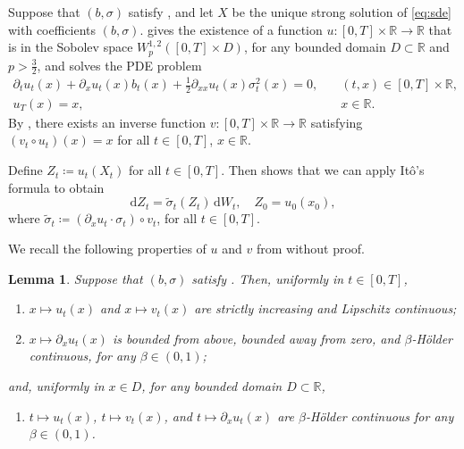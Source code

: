 \documentclass[onseside, final]{amsart}
\newtheorem{lemma}[theorem]{Lemma}
\theoremstyle{definition}
\newcommand{\R}{\mathbb R}
\newcommand{\D}{\,\mathrm{d}}
\newcommand{\ds}{\mathrm{d}}
\numberwithin{equation}{section}
\begin{document}
	Suppose that $(b, \sigma)$ satisfy , and let $X$ be the unique strong solution of \eqref{eq:sde} with coefficients $(b, \sigma)$. \citet[Theorem 1]{Zv74} gives the existence of a function $u\colon[0, T] \times \R \to \R$ that is in the Sobolev space $W^{1, 2}_p([0, T] \times D)$, for any bounded domain $D \subset \R$ and $p > \frac32$, and solves the PDE problem
	\begin{equation}\label{eq:zvonkin-pde}
		\begin{split}
			\partial_t u_t(x) + \partial_x u_t(x)b_t(x) + \frac12\partial_{xx}u_t(x)\sigma_t^2(x) = 0, & \quad (t, x) \in [0, T] \times \R,\\
				u_T(x) = x, & \quad x \in \R.
		\end{split}
	\end{equation}
	By \cite[Theorem 2]{Zv74}, there exists an inverse function $v \colon [0, T] \times \R \to \R$ satisfying $(v_t \circ u_t)(x) = x$ for all $t \in [0, T]$, $x \in \R$.
	
	Define $Z_t \coloneqq u_t(X_t)$ for all $t \in [0, T]$. Then \cite[Theorem 3]{Zv74} shows that we can apply It\^o's formula to obtain
	\begin{equation}\label{eq:transf-sde-zvonkin}
			\ds Z_t = \tilde \sigma_t(Z_t)\D W_t, \quad Z_0 = u_0(x_0),
	\end{equation}
	where $\tilde \sigma_t  \coloneqq (\partial_x u_t \cdot \sigma_t) \circ v_t$, for all $t \in [0, T]$.
	
	We recall the following properties of $u$ and $v$ from \cite[Theorem 2]{Zv74} without proof.
	\begin{lemma}\label{lem:G-properties}
		Suppose that $(b, \sigma)$ satisfy . Then, uniformly in $t \in [0, T]$,
		\begin{enumerate}[label = (\roman*)]
			\item \label{it:G1} $x \mapsto u_t(x)$ and $x \mapsto v_t(x)$ are strictly increasing and Lipschitz continuous;
			\item \label{it:G2} $x \mapsto \partial_x u_t(x)$ is bounded from above, bounded away from zero, and $\beta$-H\"older continuous, for any $\beta \in (0, 1)$;
		\end{enumerate}
		and, uniformly in $x \in D$, for any bounded domain $D \subset \R$,
		\begin{enumerate}[label = (\roman*), start = 3]
			\item \label{it:G3} $t \mapsto u_t(x)$, $t \mapsto v_t(x)$, and $t \mapsto \partial_x u_t(x)$ are $\beta$-H\"older continuous for any $\beta \in (0, 1)$.
		\end{enumerate}
	\end{lemma}
	
\end{document}
